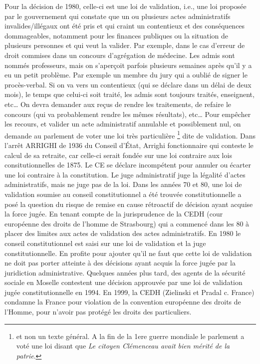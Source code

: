 \documentclass[math]{cours}
\begin{document}
Pour la décision de 1980, celle-ci est une loi de validation, i.e., une loi proposée par le gouvernement qui constate que un ou plusieurs actes administratifs invalides/illégaux ont été pris
et qui craint un contentieux et des conséquences dommageables, notamment pour les finances publiques ou la situation
de plusieurs personnes et qui veut la valider.
Par exemple, dans le cas d'erreur de droit commises dans un concours d'agrégation de médecine.
Les admis sont nommés professeurs, mais on s'aperçoit parfois plusieurs semaines après qu'il y a eu un petit problème.
Par exemple un membre du jury qui a oublié de signer le procès-verbal.
Si on va vers un contentieux (qui se déclare dans un délai de deux mois), le temps que celui-ci soit traité, les admis sont toujours traités, enseignent, etc\ldots
On devra demander aux reçus de rendre les traitements, de refaire le concours (qui va probablement rendre les mêmes résultats), etc\ldots
Pour empêcher les recours, et valider un acte administratif annulable et possiblement nul, on demande au parlement de voter une loi très particulière \footnote{et non un texte général. A la fin de la 1ere guerre mondiale le parlement a voté une loi disant que \textit{Le citoyen Clémenceau avait bien mérité de la patrie}.
} dite de validation.
Dans l'arrêt ARRIGHI de 1936 du Conseil d'État, Arrighi fonctionnaire qui conteste le calcul de sa retraite, car celle-ci serait fondée sur une loi contraire aux lois consitutionnelles de 1875.
Le CE se déclare incompétent pour annuler ou écarter une loi contraire à la constitution.
Le juge administratif juge la légalité d'actes administratifs, mais ne juge pas de la loi.
Dans les années 70 et 80, une loi de validation soumise au conseil constitutionnel a été trouvée constitutionnelle
a posé la question du risque de remise en cause rétroactif de décision ayant acquise la force jugée.
En tenant compte de la jurisprudence de la CEDH (cour européenne des droits de l'homme de Strasbourg) qui a commencé dans les 80
à placer des limites aux actes de validation des actes administratifs.
En 1980 le conseil constitutionnel est saisi sur une loi de validation et la juge constitutionnelle.
En profite pour ajouter qu'il ne faut que cette loi de validation ne doit pas porter atteinte à des décisions ayant acquis la force jugée par la juridiction administrative.
Quelques années plus tard, des agents de la sécurité sociale en Moselle contestent une décision approuvée par une loi de validation jugée constitutionnelle en 1994.
En 1999, la CEDH (Zielinski et Pradal c. France) condamne la France pour violation de la convention européenne des droits de l'Homme, pour n'avoir pas protégé les droits des particuliers.
\end{document}
